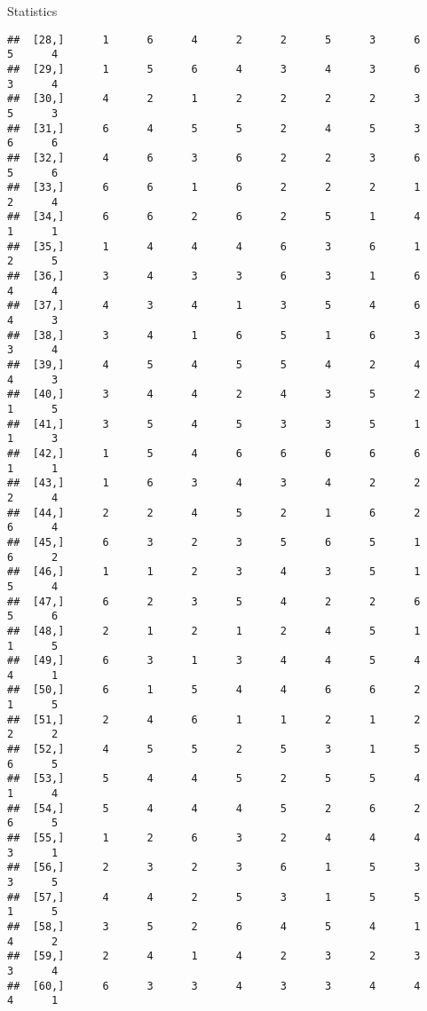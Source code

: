 \documentclass[
  ignorenonframetext,
]{beamer}
\begin{document}
\begin{frame}[fragile]{Statistics}
\begin{verbatim}
##  [28,]      1      6      4      2      2      5      3      6      5      4
##  [29,]      1      5      6      4      3      4      3      6      3      4
##  [30,]      4      2      1      2      2      2      2      3      5      3
##  [31,]      6      4      5      5      2      4      5      3      6      6
##  [32,]      4      6      3      6      2      2      3      6      5      6
##  [33,]      6      6      1      6      2      2      2      1      2      4
##  [34,]      6      6      2      6      2      5      1      4      1      1
##  [35,]      1      4      4      4      6      3      6      1      2      5
##  [36,]      3      4      3      3      6      3      1      6      4      4
##  [37,]      4      3      4      1      3      5      4      6      4      3
##  [38,]      3      4      1      6      5      1      6      3      3      4
##  [39,]      4      5      4      5      5      4      2      4      4      3
##  [40,]      3      4      4      2      4      3      5      2      1      5
##  [41,]      3      5      4      5      3      3      5      1      1      3
##  [42,]      1      5      4      6      6      6      6      6      1      1
##  [43,]      1      6      3      4      3      4      2      2      2      4
##  [44,]      2      2      4      5      2      1      6      2      6      4
##  [45,]      6      3      2      3      5      6      5      1      6      2
##  [46,]      1      1      2      3      4      3      5      1      5      4
##  [47,]      6      2      3      5      4      2      2      6      5      6
##  [48,]      2      1      2      1      2      4      5      1      1      5
##  [49,]      6      3      1      3      4      4      5      4      4      1
##  [50,]      6      1      5      4      4      6      6      2      1      5
##  [51,]      2      4      6      1      1      2      1      2      2      2
##  [52,]      4      5      5      2      5      3      1      5      6      5
##  [53,]      5      4      4      5      2      5      5      4      1      4
##  [54,]      5      4      4      4      5      2      6      2      6      5
##  [55,]      1      2      6      3      2      4      4      4      3      1
##  [56,]      2      3      2      3      6      1      5      3      3      5
##  [57,]      4      4      2      5      3      1      5      5      1      5
##  [58,]      3      5      2      6      4      5      4      1      4      2
##  [59,]      2      4      1      4      2      3      2      3      3      4
##  [60,]      6      3      3      4      3      3      4      4      4      1

\end{verbatim}
\end{frame}
\end{document}
